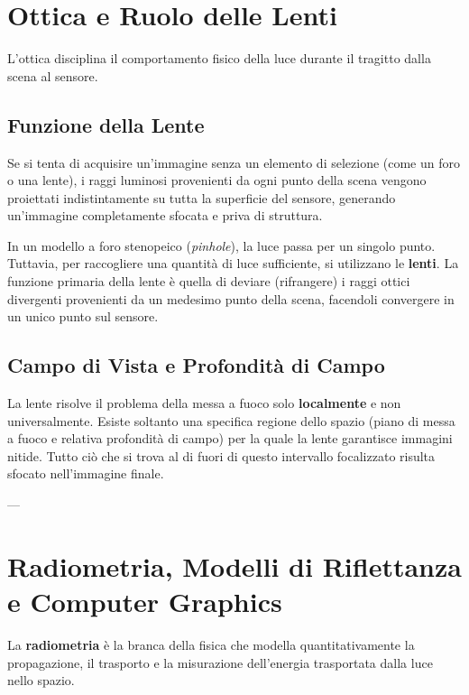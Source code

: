 \section{Ottica e Ruolo delle Lenti}

L'ottica disciplina il comportamento fisico della luce durante il tragitto dalla scena al sensore.

\subsection{Funzione della Lente}
Se si tenta di acquisire un'immagine senza un elemento di selezione (come un foro o una lente), i raggi luminosi provenienti da ogni punto della scena vengono proiettati indistintamente su tutta la superficie del sensore, generando un'immagine completamente sfocata e priva di struttura. 

In un modello a foro stenopeico (\textit{pinhole}), la luce passa per un singolo punto. Tuttavia, per raccogliere una quantità di luce sufficiente, si utilizzano le \textbf{lenti}. La funzione primaria della lente è quella di deviare (rifrangere) i raggi ottici divergenti provenienti da un medesimo punto della scena, facendoli convergere in un unico punto sul sensore.

\subsection{Campo di Vista e Profondità di Campo}
La lente risolve il problema della messa a fuoco solo \textbf{localmente} e non universalmente. Esiste soltanto una specifica regione dello spazio (piano di messa a fuoco e relativa profondità di campo) per la quale la lente garantisce immagini nitide. Tutto ciò che si trova al di fuori di questo intervallo focalizzato risulta sfocato nell'immagine finale.

---

\section{Radiometria, Modelli di Riflettanza e Computer Graphics}

La \textbf{radiometria} è la branca della fisica che modella quantitativamente la propagazione, il trasporto e la misurazione dell'energia trasportata dalla luce nello spazio.

